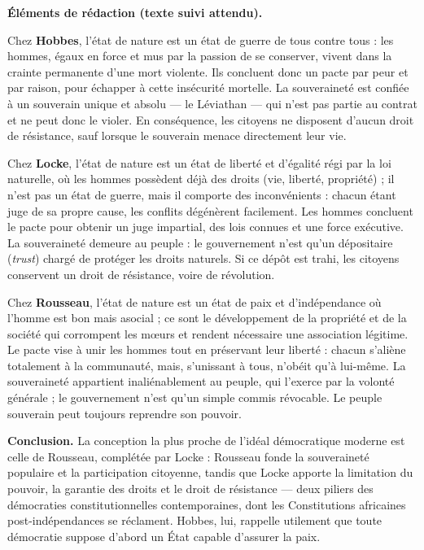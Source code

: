 \documentclass[11pt]{article}
\begin{document}
\begin{corrige}

\textbf{Éléments de rédaction (texte suivi attendu).}

Chez \textbf{Hobbes}, l'état de nature est un état de guerre de tous contre tous : les hommes, égaux en force et mus par la passion de se conserver, vivent dans la crainte permanente d'une mort violente. Ils concluent donc un pacte par peur et par raison, pour échapper à cette insécurité mortelle. La souveraineté est confiée à un souverain unique et absolu — le Léviathan — qui n'est pas partie au contrat et ne peut donc le violer. En conséquence, les citoyens ne disposent d'aucun droit de résistance, sauf lorsque le souverain menace directement leur vie.

Chez \textbf{Locke}, l'état de nature est un état de liberté et d'égalité régi par la loi naturelle, où les hommes possèdent déjà des droits (vie, liberté, propriété) ; il n'est pas un état de guerre, mais il comporte des \guillemotleft inconvénients \guillemotright : chacun étant juge de sa propre cause, les conflits dégénèrent facilement. Les hommes concluent le pacte pour obtenir un juge impartial, des lois connues et une force exécutive. La souveraineté demeure au peuple : le gouvernement n'est qu'un dépositaire (\emph{trust}) chargé de protéger les droits naturels. Si ce dépôt est trahi, les citoyens conservent un droit de résistance, voire de révolution.

Chez \textbf{Rousseau}, l'état de nature est un état de paix et d'indépendance où l'homme est bon mais asocial ; ce sont le développement de la propriété et de la société qui corrompent les mœurs et rendent nécessaire une association légitime. Le pacte vise à unir les hommes tout en préservant leur liberté : chacun s'aliène totalement à la communauté, mais, s'unissant à tous, n'obéit qu'à lui-même. La souveraineté appartient inaliénablement au peuple, qui l'exerce par la volonté générale ; le gouvernement n'est qu'un simple commis révocable. Le peuple souverain peut toujours reprendre son pouvoir.

\textbf{Conclusion.} La conception la plus proche de l'idéal démocratique moderne est celle de Rousseau, complétée par Locke : Rousseau fonde la souveraineté populaire et la participation citoyenne, tandis que Locke apporte la limitation du pouvoir, la garantie des droits et le droit de résistance — deux piliers des démocraties constitutionnelles contemporaines, dont les Constitutions africaines post-indépendances se réclament. Hobbes, lui, rappelle utilement que toute démocratie suppose d'abord un État capable d'assurer la paix.

\end{corrige}
\end{document}
